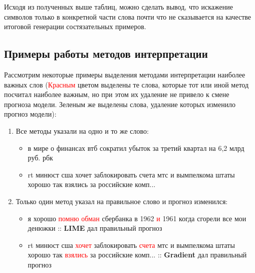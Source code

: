 \noindent\hspace{0.6cm}Исходя из полученных выше таблиц, можно сделать вывод, что искажение символов только в конкретной части слова почти что не сказывается на качестве итоговой генерации состязательных примеров.

\subsection{Примеры работы методов интерпретации}
\noindent\hspace{0.6cm}Рассмотрим некоторые примеры выделения методами интерпретации наиболее важных слов (\textcolor{red}{Красным} цветом выделены те слова, которые тот или иной метод посчитал наиболее важным, но при этом их удаление не привело к смене прогноза модели. \textcolor[RGB]{0,128,0}{Зеленым} же выделены слова, удаление которых изменило прогноз модели):
\begin{enumerate}
    \item Все методы указали на одно и то же слово:
    \begin{itemize}
        \item в мире о финансах втб \textcolor[RGB]{0,128,0}{сократил} убыток за третий квартал на 6,2 млрд руб. рбк
        \item rt минюст сша хочет \textcolor[RGB]{0,128,0}{заблокировать} счета мтс и вымпелкома штаты хорошо так взялись за российские комп...
    \end{itemize}
    \item Только один метод указал на правильное слово и прогноз изменился:
    \begin{itemize}
        \item я хорошо \textcolor{red}{помню} \textcolor{red}{обман} сбербанка в 1962 \textcolor{red}{и} 1961 когда \textcolor[RGB]{0,128,0}{сгорели} все мои денюжки :: \textbf{LIME} дал правильный прогноз
        \item rt минюст сша \textcolor{red}{хочет} \textcolor[RGB]{0,128,0}{заблокировать} \textcolor{red}{счета} мтс и вымпелкома штаты хорошо так \textcolor{red}{взялись} за российские комп... :: \textbf{Gradient} дал правильный прогноз
    \end{itemize}
\end{enumerate}


